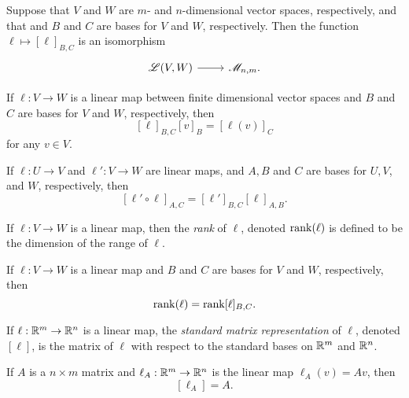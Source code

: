 \begin{lemma} \label{matrix-rep-isomorphism}
	Suppose that $V$ and $W$ are $m$- and $n$-dimensional vector spaces, respectively, and that and $B$ and $C$ are bases for $V$ and $W$, respectively. Then the function $\ell \mapsto [\ell]_{B,C}$ is an isomorphism \[ \begin{tikzcd} \mathscr{L}(V, W) \ar{r} & \mathscr{M}_{n,m}. \end{tikzcd} \] 
\end{lemma}

\begin{lemma}
	If $\ell : V \to W$ is a linear map between finite dimensional vector spaces and $B$ and $C$ are bases for $V$ and $W$, respectively, then \[ [\ell]_{B,C}[v]_B = [\ell(v)]_C \]
	for any $v  \in V$. 
\end{lemma}

\begin{lemma}
	If $\ell : U \to V$ and $\ell' :  V \to W$ are linear maps, and $A, B$ and $C$ are bases for $U, V$, and $W$, respectively, then 
	\[ [\ell' \circ \ell]_{A,C} = [\ell']_{B,C}[\ell]_{A,B}. \]
\end{lemma}

\begin{definition}
	If $\ell : V \to W$ is a linear map, then the \emph{rank} of $\ell$, denoted $\operatorname{rank}(\ell)$ is defined to be the dimension of the range of $\ell$. 
\end{definition}

\begin{lemma}
	If $\ell : V \to W$ is a linear map and $B$ and $C$ are bases for $V$ and $W$, respectively, then \[ \operatorname{rank} (\ell) = \operatorname{rank} [\ell]_{B,C}. \]
\end{lemma}

\begin{definition} \label{matrix-representation-standard}  
	If $\ell : \mathbb{R}^m \to \mathbb{R}^n$ is a linear map, the \emph{standard matrix representation} of $\ell$, denoted $[\ell]$, is the matrix of $\ell$ with respect to the standard bases on $\mathbb{R}^m$ and $\mathbb{R}^n$.
\end{definition} 

\begin{lemma}
	If $A$ is a $n \times m$ matrix and $\ell_A : \mathbb{R}^m \to \mathbb{R}^n$ is the linear map $\ell_A(v) = Av$, then \[ [\ell_A] = A. \]
\end{lemma}

